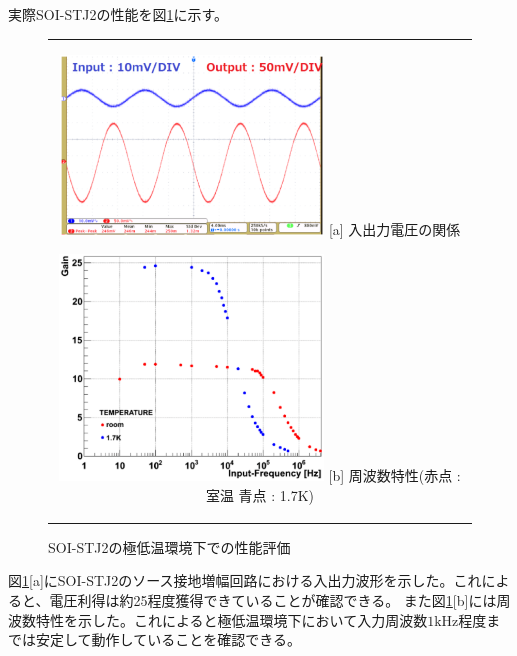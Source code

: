 		実際SOI-STJ2の性能を図\ref{fig:SOISTJ2_chara}に示す。
		\begin{figure}[htbp]
			\begin{center}
				\begin{tabular}{c}
					\begin{minipage}{0.5\hsize}
						\begin{center}
							\includegraphics[clip, width=7.0cm]{./Chapter/Chapter3/Picture/SOISTJ2_InOut.eps}
							\hspace{1.6cm} [a] 入出力電圧の関係
						\end{center}
					\end{minipage}
					\begin{minipage}{0.5\hsize}
						\begin{center}
							\includegraphics[clip, width=7.0cm]{./Chapter/Chapter3/Picture/SOISTJ2_frequency.eps}
							\hspace{1.6cm} [b] 周波数特性(赤点 : 室温  青点 : 1.7K)
						\end{center}
					\end{minipage}
				\end{tabular}
				\caption{SOI-STJ2の極低温環境下での性能評価}
				\label{fig:SOISTJ2_chara}
			\end{center}
		\end{figure}
		図\ref{fig:SOISTJ2_chara}[a]にSOI-STJ2のソース接地増幅回路における入出力波形を示した。これによると、電圧利得は約25程度獲得できていることが確認できる。
		また図\ref{fig:SOISTJ2_chara}[b]には周波数特性を示した。これによると極低温環境下において入力周波数$1\mathrm{kHz}$程度までは安定して動作していることを確認できる。
		
